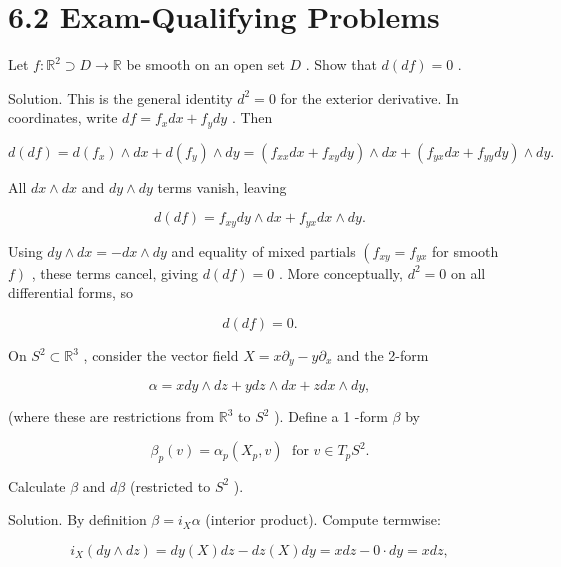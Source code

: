\documentclass[10pt]{article}
\begin{document}
\section*{6.2 Exam-Qualifying Problems}

\begin{problem}[title=PROBLEM 5 (5 POINTS)]
Let \(f : {\mathbb{R}}^{2} \supset  D \rightarrow  \mathbb{R}\) be smooth on an open set \(D\) . Show that \(d\left( {df}\right)  = 0\) .
\end{problem}

Solution. This is the general identity \({d}^{2} = 0\) for the exterior derivative. In coordinates, write \({df} = {f}_{x}{dx} + {f}_{y}{dy}\) . Then

\[
d\left( {df}\right)  = d\left( {f}_{x}\right)  \land  {dx} + d\left( {f}_{y}\right)  \land  {dy} = \left( {{f}_{xx}{dx} + {f}_{xy}{dy}}\right)  \land  {dx} + \left( {{f}_{yx}{dx} + {f}_{yy}{dy}}\right)  \land  {dy}.
\]

All \({dx} \land  {dx}\) and \({dy} \land  {dy}\) terms vanish, leaving

\[
d\left( {df}\right)  = {f}_{xy}{dy} \land  {dx} + {f}_{yx}{dx} \land  {dy}.
\]

Using \({dy} \land  {dx} =  - {dx} \land  {dy}\) and equality of mixed partials \(\left( {{f}_{xy} = {f}_{yx}}\right.\) for smooth \(\left. f\right)\) , these terms cancel, giving \(d\left( {df}\right)  = 0\) . More conceptually, \({d}^{2} = 0\) on all differential forms, so

\[
d\left( {df}\right)  = 0.
\]

\begin{problem}[title=PROBLEM 6 (5 POINTS)]
On \({S}^{2} \subset  {\mathbb{R}}^{3}\) , consider the vector field \(X = x{\partial }_{y} - y{\partial }_{x}\) and the 2-form

\[
\alpha  = {xdy} \land  {dz} + {ydz} \land  {dx} + {zdx} \land  {dy},
\]

(where these are restrictions from \({\mathbb{R}}^{3}\) to \({S}^{2}\) ). Define a 1 -form \(\beta\) by

\[
{\beta }_{p}\left( v\right)  = {\alpha }_{p}\left( {{X}_{p},v}\right) \;\text{ for }v \in  {T}_{p}{S}^{2}.
\]

Calculate \(\beta\) and \({d\beta }\) (restricted to \({S}^{2}\) ).
\end{problem}

Solution. By definition \(\beta  = {i}_{X}\alpha\) (interior product). Compute termwise:

\[
{i}_{X}\left( {{dy} \land  {dz}}\right)  = {dy}\left( X\right) {dz} - {dz}\left( X\right) {dy} = {xdz} - 0 \cdot  {dy} = {xdz},
\]
\end{document}
